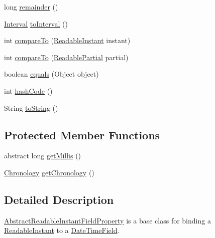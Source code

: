 \begin{DoxyCompactItemize}
\item 
long \hyperlink{classorg_1_1joda_1_1time_1_1field_1_1_abstract_readable_instant_field_property_abc0b697eae3cd5b6bc6bb576ef4ee98b}{remainder} ()
\item 
\hyperlink{classorg_1_1joda_1_1time_1_1_interval}{Interval} \hyperlink{classorg_1_1joda_1_1time_1_1field_1_1_abstract_readable_instant_field_property_a0b995641bc5e0f592aa2fbd1f17ed3ea}{to\-Interval} ()
\item 
int \hyperlink{classorg_1_1joda_1_1time_1_1field_1_1_abstract_readable_instant_field_property_ab3b828cf41572ae6d8c355871881ad12}{compare\-To} (\hyperlink{interfaceorg_1_1joda_1_1time_1_1_readable_instant}{Readable\-Instant} instant)
\item 
int \hyperlink{classorg_1_1joda_1_1time_1_1field_1_1_abstract_readable_instant_field_property_a1c5e4304592481b7a9d8b7697e7aaa02}{compare\-To} (\hyperlink{interfaceorg_1_1joda_1_1time_1_1_readable_partial}{Readable\-Partial} partial)
\item 
boolean \hyperlink{classorg_1_1joda_1_1time_1_1field_1_1_abstract_readable_instant_field_property_ad0c814219381c0e20e8d8ca8119676b6}{equals} (Object object)
\item 
int \hyperlink{classorg_1_1joda_1_1time_1_1field_1_1_abstract_readable_instant_field_property_a7de0b14367a2333b5615ef5c92cd37fa}{hash\-Code} ()
\item 
String \hyperlink{classorg_1_1joda_1_1time_1_1field_1_1_abstract_readable_instant_field_property_a0665457e194221ee13aaa5452854aa82}{to\-String} ()
\end{DoxyCompactItemize}
\subsection*{Protected Member Functions}
\begin{DoxyCompactItemize}
\item 
abstract long \hyperlink{classorg_1_1joda_1_1time_1_1field_1_1_abstract_readable_instant_field_property_a26d4f009f689584cb8d674df32e4fd31}{get\-Millis} ()
\item 
\hyperlink{classorg_1_1joda_1_1time_1_1_chronology}{Chronology} \hyperlink{classorg_1_1joda_1_1time_1_1field_1_1_abstract_readable_instant_field_property_a18cc46b62d562f0502a99d8c1f2d9610}{get\-Chronology} ()
\end{DoxyCompactItemize}


\subsection{Detailed Description}
\hyperlink{classorg_1_1joda_1_1time_1_1field_1_1_abstract_readable_instant_field_property}{Abstract\-Readable\-Instant\-Field\-Property} is a base class for binding a \hyperlink{interfaceorg_1_1joda_1_1time_1_1_readable_instant}{Readable\-Instant} to a \hyperlink{classorg_1_1joda_1_1time_1_1_date_time_field}{Date\-Time\-Field}. 

